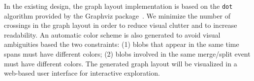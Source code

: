 In the existing design, the graph layout implementation is based on the \texttt{dot} algorithm provided by the Graphviz package~\cite{GansnerN00}.  We minimize the number of crossings in the graph layout in order to reduce visual clutter and to increase readability.  An automatic color scheme is also generated to avoid visual ambiguities based the two constraints: (1) blobs that appear in the same time spans must have different colors; (2) blobs involved in the same merge/split event must have different colors.  The generated graph layout will be visualized in a web-based user interface for interactive exploration. 


% 


% 

